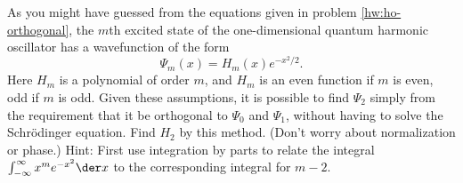 As you might have guessed from the equations given in problem \ref{hw:ho-orthogonal},
the $m$th excited state of the one-dimensional quantum harmonic oscillator has
a wavefunction of the form
\begin{equation*}
  \Psi_m(x)=H_m(x)e^{-x^2/2}.
\end{equation*}
Here $H_m$ is a polynomial of order $m$, and $H_m$ is an even function if $m$ is
even, odd if $m$ is odd. Given these assumptions, it is possible to find $\Psi_2$
simply from the requirement that it be orthogonal to $\Psi_0$ and $\Psi_1$, without
having to solve the Schr\"{o}dinger equation. Find $H_2$ by this method. (Don't worry
about normalization or phase.)
Hint: First use integration by parts to relate the integral
$\int_{-\infty}^{\infty}x^m e^{-x^2}\der x$ to the corresponding integral
for $m-2$.\answercheck

